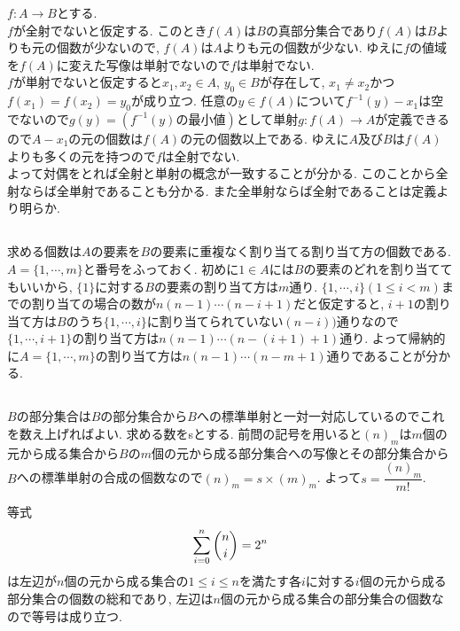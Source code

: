 \documentclass{jsarticle}
\begin{document}
$f:A \rightarrow B$とする.\\
$f$が全射でないと仮定する. このとき$f(A)$は$B$の真部分集合であり$f(A)$は$B$よりも元の個数が少ないので, $f(A)$は$A$よりも元の個数が少ない. ゆえに$f$の値域を$f(A)$に変えた写像は単射でないので$f$は単射でない.\\
$f$が単射でないと仮定すると$x_1, x_2 \in A$, $y_0 \in B$が存在して, $x_1 \neq x_2$かつ$f(x_1) = f(x_2) = y_0$が成り立つ. 任意の$y \in f(A)$について$f^{-1}(y) - {x_1}$は空でないので$g(y) = (f^{-1}(y)の最小値)$として単射$g:f(A) \rightarrow A$が定義できるので$A - {x_1}$の元の個数は$f(A)$の元の個数以上である. ゆえに$A$及び$B$は$f(A)$よりも多くの元を持つので$f$は全射でない.\\
よって対偶をとれば全射と単射の概念が一致することが分かる. このことから全射ならば全単射であることも分かる. また全単射ならば全射であることは定義より明らか.

\subsection{} %
求める個数は$A$の要素を$B$の要素に重複なく割り当てる割り当て方の個数である. $A = \{1, \cdots, m\}$と番号をふっておく. 初めに$1 \in A$には$B$の要素のどれを割り当ててもいいから, $\{1\}$に対する$B$の要素の割り当て方は$m$通り. $\{1, \cdots, i\} (1 \leq i < m)$までの割り当ての場合の数が$n(n - 1)\cdots(n - i + 1)$だと仮定すると, $i + 1$の割り当て方は$B$のうち$\{1, \cdots, i\}$に割り当てられていない$(n - i))$通りなので$\{1, \cdots, i + 1\}$の割り当て方は$n(n - 1)\cdots(n - (i + 1) + 1)$通り. よって帰納的に$A = \{1, \cdots, m\}$の割り当て方は$n(n - 1)\cdots(n - m + 1)$通りであることが分かる.

\subsection{} %
$B$の部分集合は$B$の部分集合から$B$への標準単射と一対一対応しているのでこれを数え上げればよい. 求める数をsとする. 前問の記号を用いると$(n)_m$は$m$個の元から成る集合から$B$の$m$個の元から成る部分集合への写像とその部分集合から$B$への標準単射の合成の個数なので$(n)_m = s \times (m)_m$. よって$s = \dfrac{(n)_m}{m!}$.

等式
\begin{equation*}
	\sum_{i = 0}^n\dbinom{n}{i} = 2^n
\end{equation*}
は左辺が$n$個の元から成る集合の$1 \leq i \leq n$を満たす各$i$に対する$i$個の元から成る部分集合の個数の総和であり, 左辺は$n$個の元から成る集合の部分集合の個数なので等号は成り立つ.
\end{document}
